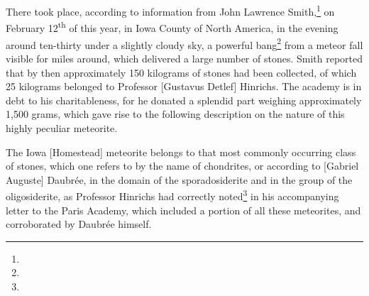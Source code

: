 \documentclass[a4paper, 12pt, oneside]{article}
\begin{document}
\section{}
\subsection{}
\subsubsection*{}
\paragraph*{}
There took place, according to information from John Lawrence Smith,\footnote{} on February 12\textsuperscript{th} of this year, in Iowa County of North America, in the evening around ten-thirty under a slightly cloudy sky, a powerful bang\footnote{} from a meteor fall visible for miles around, which delivered a large number of stones. Smith reported that by then approximately 150 kilograms of stones had been collected, of which 25 kilograms belonged to Professor [Gustavus Detlef] Hinrichs. The academy is in debt to his charitableness, for he donated a splendid part weighing approximately 1,500 grams, which gave rise to the following description on the nature of this highly peculiar meteorite.

The Iowa [Homestead] meteorite belongs to that most commonly occurring class of stones, which one refers to by the name of chondrites, or according to [Gabriel Auguste] Daubrée, in the domain of the sporadosiderite and in the group of the oligosiderite, as Professor Hinrichs had correctly noted\footnote{} in his accompanying letter to the Paris Academy, which included a portion of all these meteorites, and corroborated by Daubrée himself.
\end{document}

